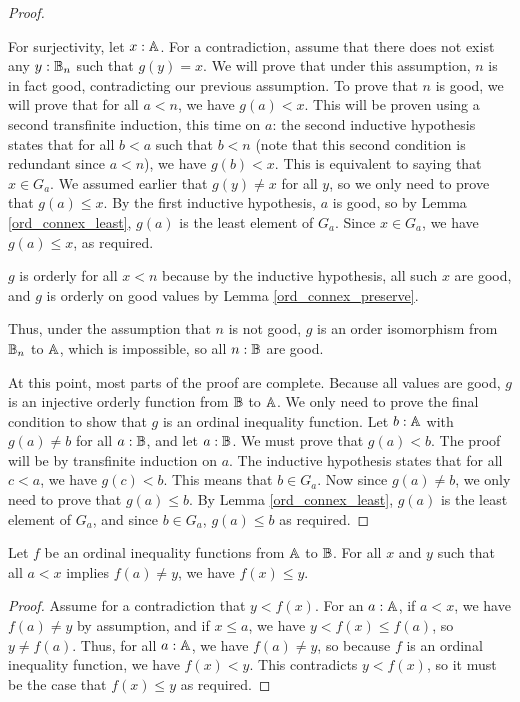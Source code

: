 \documentclass[../../math.tex]{subfiles}
\begin{document}
\begin{proof}
\begin{subproof}
        For surjectivity, let $x : \mathbb{A}$.  For a contradiction, assume that there
        does not exist any $y : \mathbb{B}_n$ such that $g(y) = x$.  We will prove that
        under this assumption, $n$ is in fact good, contradicting our previous
        assumption.  To prove that $n$ is good, we will prove that for all $a <
        n$, we have $g(a) < x$.  This will be proven using a second transfinite
        induction, this time on $a$: the second inductive hypothesis states that
        for all $b < a$ such that $b < n$ (note that this second condition is
        redundant since $a < n$), we have $g(b) < x$.  This is equivalent to
        saying that $x \in G_a$.  We assumed earlier that $g(y) \neq x$ for all
        $y$, so we only need to prove that $g(a) \leq x$.  By the first
        inductive hypothesis, $a$ is good, so by Lemma \ref{ord_connex_least},
        $g(a)$ is the least element of $G_a$.  Since $x \in G_a$, we have $g(a)
        \leq x$, as required.

        $g$ is orderly for all $x < n$ because by the inductive hypothesis, all
        such $x$ are good, and $g$ is orderly on good values by Lemma
        \ref{ord_connex_preserve}.

        Thus, under the assumption that $n$ is not good, $g$ is an order
        isomorphism from $\mathbb{B}_n$ to $\mathbb{A}$, which is impossible, so all $n : \mathbb{B}$
        are good.
    \end{subproof}
    At this point, most parts of the proof are complete.  Because all values are
    good, $g$ is an injective orderly function from $\mathbb{B}$ to $\mathbb{A}$.  We only need
    to prove the final condition to show that $g$ is an ordinal inequality
    function.  Let $b : \mathbb{A}$ with $g(a) \neq b$ for all $a : \mathbb{B}$, and let $a :
    \mathbb{B}$.  We must prove that $g(a) < b$.  The proof will be by transfinite
    induction on $a$.  The inductive hypothesis states that for all $c < a$, we
    have $g(c) < b$.  This means that $b \in G_a$.  Now since $g(a) \neq b$, we
    only need to prove that $g(a) \leq b$.  By Lemma \ref{ord_connex_least},
    $g(a)$ is the least element of $G_a$, and since $b \in G_a$, $g(a) \leq b$
    as required.
\end{proof}

\begin{lemma} \label{ord_le_part}
    Let $f$ be an ordinal inequality functions from $\mathbb{A}$ to $\mathbb{B}$.  For all $x$
    and $y$ such that all $a < x$ implies $f(a) \neq y$, we have $f(x) \leq y$.
\end{lemma}
\begin{proof}
    Assume for a contradiction that $y < f(x)$.  For an $a : \mathbb{A}$, if $a < x$, we
    have $f(a) \neq y$ by assumption, and if $x \leq a$, we have $y < f(x) \leq
    f(a)$, so $y \neq f(a)$.  Thus, for all $a : \mathbb{A}$, we have $f(a) \neq y$, so
    because $f$ is an ordinal inequality function, we have $f(x) < y$.  This
    contradicts $y < f(x)$, so it must be the case that $f(x) \leq y$ as
    required.
\end{proof}
\end{document}

